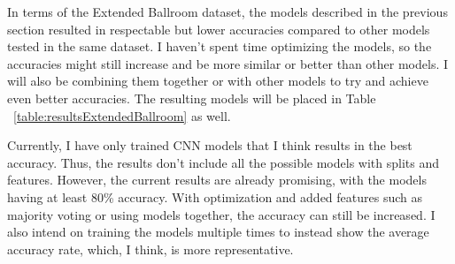 \documentclass[10pt,twocolumn,letterpaper]{article}
\begin{document}
	\begin{table}[!htbp] %
		\caption{Results on Extended Ballroom}
		\centering
	\label{table:resultsExtendedBallroom}
	\end{table}

	In terms of the Extended Ballroom dataset, the models described in the previous section resulted in respectable but lower accuracies compared to other models tested in the same dataset. I haven't spent time optimizing the models, so the accuracies might still increase and be more similar or better than other models. I will also be combining them together or with other models to try and achieve even better accuracies. The resulting models will be placed in Table ~\ref{table:resultsExtendedBallroom} as well.
	
	Currently, I have only trained CNN models that I think results in the best accuracy. Thus, the results don't include all the possible models with splits and features. However, the current results are already promising, with the models having at least 80\% accuracy. With optimization and added features such as majority voting or using models together, the accuracy can still be increased. I also intend on training the models multiple times to instead show the average accuracy rate, which, I think, is more representative. 
	
\end{document}
